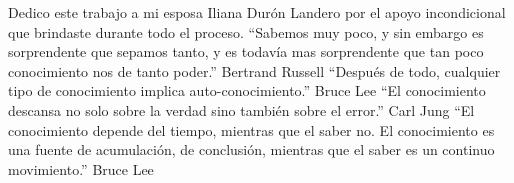 
% 






Dedico este trabajo a mi esposa Iliana Durón Landero por el apoyo incondicional
que brindaste durante todo el proceso. 
“Sabemos muy poco, y sin embargo es
sorprendente que sepamos tanto, y es todavía mas sorprendente que tan poco
conocimiento nos de tanto poder.” Bertrand Russell        
“Después de todo, cualquier tipo de conocimiento implica auto-conocimiento.” Bruce Lee 
“El conocimiento descansa no solo sobre la verdad sino también sobre el error.” Carl
Jung 
“El conocimiento depende del tiempo, mientras que el saber no. El
conocimiento es una fuente de acumulación, de conclusión, mientras que el saber
es un continuo movimiento.” Bruce Lee











